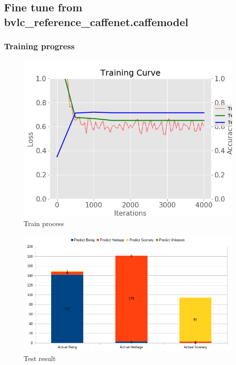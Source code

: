 \documentclass[11pt]{article}
\begin{document}
\subsection{Fine tune from bvlc\_reference\_caffenet.caffemodel}

\subsubsection{Training progress}

\begin{figure}[H]
\centering
\includegraphics[width=1\textwidth]{images/train_large_dataset_pooling_5x5_stride_3}
\caption{Train process}
\end{figure}

\begin{figure}[H]
\centering
\includegraphics[width=1\textwidth]{images/train_large_dataset_fine_tune}
\caption{Test result}
\end{figure}
\end{document}
